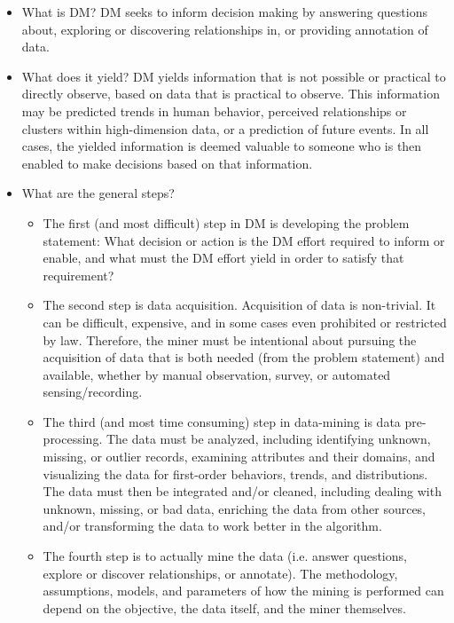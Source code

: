 \documentclass[fleqn,10pt]{SelfArx} %
\begin{document}
\begin{itemize}[noitemsep]

\item What is DM?  DM seeks to inform decision making by answering questions about, exploring or discovering relationships in, or providing annotation of data.

\item What does it yield?  DM yields information that is not possible or practical to directly observe, based on data that is practical to observe.  This information may be predicted trends in human behavior, perceived relationships or clusters within high-dimension data, or a prediction of future events.  In all cases, the yielded information is deemed valuable to someone who is then enabled to make decisions based on that information.

\item What are the general steps?  

\begin{itemize}
	
	\item The first (and most difficult) step in DM is developing the problem statement: What decision or action is the DM effort required to inform or enable, and what must the DM effort yield in order to satisfy that requirement?
	
	\item The second step is data acquisition.  Acquisition of data is non-trivial.  It can be difficult, expensive, and in some cases even prohibited or restricted by law.  Therefore, the miner must be intentional about pursuing the acquisition of data that is both needed (from the problem statement) and available, whether by manual observation, survey, or automated sensing/recording.
	
	\item The third (and most time consuming) step in data-mining is data pre-processing.  The data must be analyzed, including identifying unknown, missing, or outlier records, examining attributes and their domains, and visualizing the data for first-order behaviors, trends, and distributions.  The data must then be integrated and/or cleaned, including dealing with unknown, missing, or bad data, enriching the data from other sources, and/or transforming the data to work better in the algorithm.
	
	\item The fourth step is to actually mine the data (i.e. answer questions, explore or discover relationships, or annotate).  The methodology, assumptions, models, and parameters of how the mining is performed can depend on the objective, the data itself, and the miner themselves.
	

\end{itemize}
\end{itemize}
\end{document}
